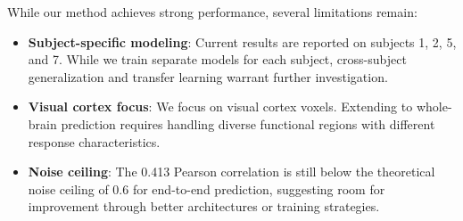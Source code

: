 While our method achieves strong performance, several limitations remain:
\begin{itemize}
  \item \textbf{Subject-specific modeling}: Current results are reported on subjects 1, 2, 5, and 7.
        While we train separate models for each subject,
        cross-subject generalization and transfer learning warrant further investigation.
  \item \textbf{Visual cortex focus}: We focus on visual cortex voxels.
        Extending to whole-brain prediction requires handling diverse functional regions
        with different response characteristics.
  \item \textbf{Noise ceiling}: The 0.413 Pearson correlation is still below the theoretical noise ceiling of 0.6
        for end-to-end prediction, suggesting room for improvement through better architectures or training strategies.
\end{itemize}
